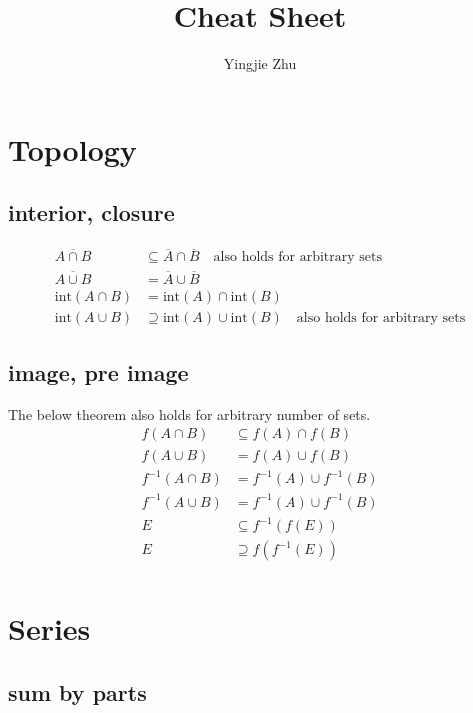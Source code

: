 \documentclass[11pt,a4paper]{article}
\title{Cheat Sheet}
\author{Yingjie Zhu}
\begin{document}
\maketitle


\section{Topology}

\subsection{interior, closure}

\begin{align*}
    \overline{A \cap B} &\subseteq \overline{A} \cap \overline{B} \quad \text{also holds for arbitrary sets} \\
    \overline{A \cup B} &= \overline{A} \cup \overline{B} \\
    \mathrm{int}(A \cap B) &= \mathrm{int}(A) \cap \mathrm{int}(B) \\
    \mathrm{int}(A \cup B) &\supseteq \mathrm{int}(A) \cup \mathrm{int}(B) \quad \text{also holds for arbitrary sets}
\end{align*}

\subsection{image, pre image}

The below theorem also holds for arbitrary number of sets.
\begin{align*}
f(A \cap B) &\subseteq f(A) \cap f(B)  \\
f(A \cup B) & =  f(A) \cup f(B) \\
f^{-1}(A \cap B) & =  f^{-1}(A) \cup f^{-1}(B) \\
f^{-1}(A \cup B) & =  f^{-1}(A) \cup f^{-1}(B) \\
E  & \subseteq f^{-1}(f(E)) \\
E  & \supseteq f(f^{-1}(E)) \\
\end{align*}

\section{Series}

\subsection{sum by parts}
\end{document}
